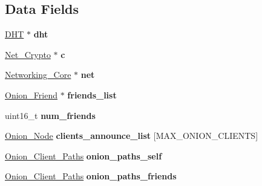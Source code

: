 \subsection*{Data Fields}
\begin{DoxyCompactItemize}
\item 
\hypertarget{struct_onion___client_a8b3d6ce8745acc52695e252bdb1531b6}{\hyperlink{struct_d_h_t}{D\+H\+T} $\ast$ {\bfseries dht}}\label{struct_onion___client_a8b3d6ce8745acc52695e252bdb1531b6}

\item 
\hypertarget{struct_onion___client_a0f5b9349eb586149cef9017eed2abdfe}{\hyperlink{struct_net___crypto}{Net\+\_\+\+Crypto} $\ast$ {\bfseries c}}\label{struct_onion___client_a0f5b9349eb586149cef9017eed2abdfe}

\item 
\hypertarget{struct_onion___client_aa14ea2f67950f57fe4235d7375a2216c}{\hyperlink{struct_networking___core}{Networking\+\_\+\+Core} $\ast$ {\bfseries net}}\label{struct_onion___client_aa14ea2f67950f57fe4235d7375a2216c}

\item 
\hypertarget{struct_onion___client_ad2d8940ddd914d8b046938ef4f9d313d}{\hyperlink{struct_onion___friend}{Onion\+\_\+\+Friend} $\ast$ {\bfseries friends\+\_\+list}}\label{struct_onion___client_ad2d8940ddd914d8b046938ef4f9d313d}

\item 
\hypertarget{struct_onion___client_a8ee1f2d7e543bce350c591a8eaac0cf8}{uint16\+\_\+t {\bfseries num\+\_\+friends}}\label{struct_onion___client_a8ee1f2d7e543bce350c591a8eaac0cf8}

\item 
\hypertarget{struct_onion___client_a21a83b6615ce3ab53739031a355aeabd}{\hyperlink{struct_onion___node}{Onion\+\_\+\+Node} {\bfseries clients\+\_\+announce\+\_\+list} \mbox{[}M\+A\+X\+\_\+\+O\+N\+I\+O\+N\+\_\+\+C\+L\+I\+E\+N\+T\+S\mbox{]}}\label{struct_onion___client_a21a83b6615ce3ab53739031a355aeabd}

\item 
\hypertarget{struct_onion___client_a917f02fe81d007c9668083e0ac9ff0c7}{\hyperlink{struct_onion___client___paths}{Onion\+\_\+\+Client\+\_\+\+Paths} {\bfseries onion\+\_\+paths\+\_\+self}}\label{struct_onion___client_a917f02fe81d007c9668083e0ac9ff0c7}

\item 
\hypertarget{struct_onion___client_a52bae59a292facb41ff98ea0efe8e68f}{\hyperlink{struct_onion___client___paths}{Onion\+\_\+\+Client\+\_\+\+Paths} {\bfseries onion\+\_\+paths\+\_\+friends}}\label{struct_onion___client_a52bae59a292facb41ff98ea0efe8e68f}


\end{DoxyCompactItemize}
